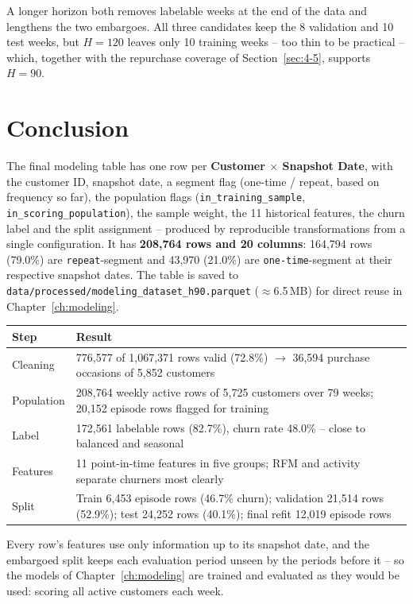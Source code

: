 A longer horizon both removes labelable weeks at the end of the data and lengthens the two embargoes. All three candidates keep the 8 validation and 10 test weeks, but $H = 120$ leaves only 10 training weeks -- too thin to be practical -- which, together with the repurchase coverage of Section~\ref{sec:4-5}, supports $H = 90$.

\section{Conclusion}
\label{sec:5-7}

The final modeling table has one row per \textbf{Customer $\times$ Snapshot Date}, with the customer ID, snapshot date, a segment flag (one-time / repeat, based on frequency so far), the population flags (\texttt{in\_training\_sample}, \texttt{in\_scoring\_population}), the sample weight, the 11 historical features, the churn label and the split assignment -- produced by reproducible transformations from a single configuration. It has \textbf{208,764 rows and 20 columns}: 164,794 rows (79.0\%) are \texttt{repeat}-segment and 43,970 (21.0\%) are \texttt{one-time}-segment at their respective snapshot dates. The table is saved to \texttt{data/processed/}\allowbreak\texttt{modeling\_dataset\_h90.parquet} ($\approx$6.5\,MB) for direct reuse in Chapter~\ref{ch:modeling}.

\begin{center}
\begin{tabular}{@{}p{3.4cm}p{10.7cm}@{}}
    \toprule
    Step & Result \\
    \midrule
    Cleaning & 776,577 of 1,067,371 rows valid (72.8\%) $\rightarrow$ 36,594 purchase occasions of 5,852 customers \\
    Population & 208,764 weekly active rows of 5,725 customers over 79 weeks; 20,152 episode rows flagged for training \\
    Label & 172,561 labelable rows (82.7\%), churn rate 48.0\% -- close to balanced and seasonal \\
    Features & 11 point-in-time features in five groups; RFM and activity separate churners most clearly \\
    Split & Train 6,453 episode rows (46.7\% churn); validation 21,514 rows (52.9\%); test 24,252 rows (40.1\%); final refit 12,019 episode rows \\
    \bottomrule
\end{tabular}
\end{center}

Every row's features use only information up to its snapshot date, and the embargoed split keeps each evaluation period unseen by the periods before it -- so the models of Chapter~\ref{ch:modeling} are trained and evaluated as they would be used: scoring all active customers each week.
